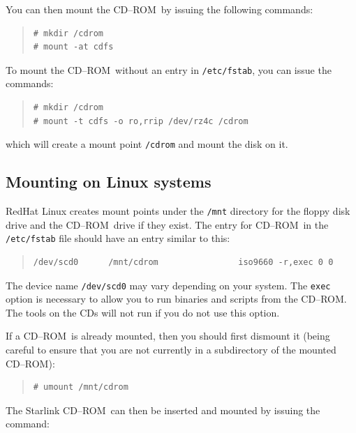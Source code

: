 \documentclass[twoside,11pt]{article}
\newcommand{\xlabel}[1]{}
\renewcommand{\_}{\texttt{\symbol{95}}}
\newcommand{\cdrom}{CD--ROM}
\newcommand{\cdrom}{CD-ROM}
\begin{document}
You can then mount the \cdrom\ by issuing the following commands:

\begin{quote}
\begin{verbatim}
# mkdir /cdrom
# mount -at cdfs
\end{verbatim}
\end{quote}

To mount the \cdrom\ without an entry in \texttt{/etc/fstab}, you can issue
the commands:

\begin{quote}
\begin{verbatim}
# mkdir /cdrom
# mount -t cdfs -o ro,rrip /dev/rz4c /cdrom
\end{verbatim}
\end{quote}

which will create a mount point \texttt{/cdrom} and mount the disk on it.

\subsection{\xlabel{mounting_on_linux}Mounting on Linux systems}
\label{mounting_on_linux}

RedHat Linux creates mount points under the \texttt{/mnt} directory for
the floppy disk drive and the \cdrom\ drive if they exist.  The entry for
\cdrom\ in the \texttt{/etc/fstab} file should have an entry
similar to this:

\begin{quote}
\begin{verbatim}
/dev/scd0      /mnt/cdrom                iso9660 -r,exec 0 0
\end{verbatim}
\end{quote}

The device name \texttt{/dev/scd0} may vary depending on your system.  The
\texttt{exec} option is necessary to allow you to run binaries and
scripts from the \cdrom.   The tools on the CDs will not run if you do not
use this option.

If a \cdrom\ is already mounted, then you should first dismount it
(being careful to ensure that you are not currently in a subdirectory
of the mounted \cdrom):

\begin{quote}
\begin{verbatim}
# umount /mnt/cdrom
\end{verbatim}
\end{quote}

The Starlink \cdrom\ can then be inserted and mounted by issuing the command:
\end{document}

